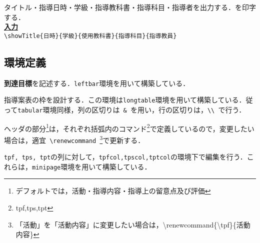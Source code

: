 \documentclass[paper=a4,fontsize=10.5pt]{jlreq}
\begin{document}
\noindent\ovalbox{\large \verb|\showTitle|}\par
タイトル・指導日時・学級・指導教科書・指導科目・指導者を出力する．を印字する．\\
\underline{\textbf{入力}}\\
\verb|\showTitle{日時}{学級}{使用教科書}{指導科目}{指導教員}|\\
\begin{leftbar}
    \section*{環境定義}
\end{leftbar}
\noindent{}\par
\textbf{到達目標}を記述する．\verb|leftbar|環境を用いて構築している．\\
\noindent{}\par
指導案表の枠を設計する．この環境は\verb|longtable|環境を用いて構築している．従って\verb|tabular|環境同様，列の区切りは\verb| & |を用い，行の区切りは，\verb|\\ |で行う．\par
ヘッダの部分\footnote{デフォルトでは，活動・指導内容・指導上の留意点及び評価}は，それぞれ括弧内のコマンド\footnote{tpf,tps,tpt}で定義しているので，変更したい場合は，適宜\verb| \renewcommand |\footnote{「活動」を「活動内容」に変更したい場合は，{\ttfamily\textbackslash renewcommand\{\textbackslash tpf\}\{活動内容\}}}で更新する．\vspace{0.5em}\\
\par
\verb|tpf, tps, tpt|の列に対して，\verb|tpfcol,tpscol,tptcol|の環境下で編集を行う．これらは，\verb|minipage|環境を用いて構築している．\par
\renewcommand{\tpf}{活動（tpf）}
\renewcommand{\tps}{指導内容（tps）}
\renewcommand{\tpt}{指導上の留意点及び評価（tpt）}
\end{document}
